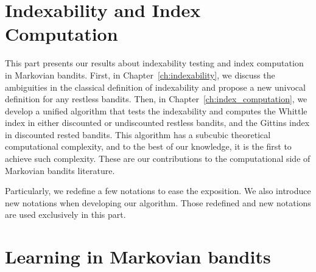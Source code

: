 \documentclass[%
    paper=A4,              %
    twoside=true,          %
    openright,             %
    parskip=half,          %
    chapterprefix=true,    %
    11pt,                  %
    headings=normal,       %
    bibliography=totoc,    %
    listof=totoc,          %
    titlepage=on,          %
    captions=tableabove,   %
    chapterprefix=false,   %
    appendixprefix=false,  %
    draft=false,           %
]{scrreprt}
\newcommand{\KK}[1]{\todo[color=green!10,author=\textbf{\small KK},inline]{\small #1\\}}
\begin{document}

\iftotalcompilation
\part{Indexability and Index Computation}
\label{part:idx}


This part presents our results about indexability testing and index computation in Markovian bandits. First, in Chapter~\ref{ch:indexability}, we discuss the ambiguities in the classical definition of indexability and propose a new univocal definition for any restless bandits. Then, in Chapter~\ref{ch:index_computation}, we develop a unified algorithm that tests the indexability and computes the Whittle index in either discounted or undiscounted restless bandits, and the Gittins index in discounted rested bandits. This algorithm has a subcubic theoretical computational complexity, and to the best of our knowledge, it is the first to achieve such complexity. These are our contributions to the computational side of Markovian bandits literature.

Particularly, we redefine a few notations to ease the exposition.
We also introduce new notations when developing our algorithm.
Those redefined and new notations are used exclusively in this part.

\cleardoublepage %
\clearpage
\fi




\iftotalcompilation
\part{Learning in Markovian bandits}
\label{part:learning}
\end{document}
